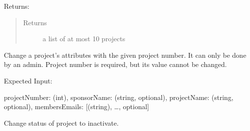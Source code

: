 \documentclass[letterpaper,10pt,english]{sphinxmanual}
\begin{document}
\begin{fulllineitems}
\begin{fulllineitems}
Returns:

\begin{sphinxVerbatim}
\end{sphinxVerbatim}
\begin{quote}\begin{description}
\item[{Returns}] \leavevmode
a list of at most 10 projects

\end{description}\end{quote}

\end{fulllineitems}


\begin{fulllineitems}
\label{\detokenize{apidoc/utdesign_procurement:utdesign_procurement.apigateway.ApiGateway.projectEdit}}
Change a project’s attributes with the given project number. It
can only be done by an admin. Project number is required, but
its value cannot be changed.

Expected Input:

\begin{sphinxVerbatim}[commandchars=\\\{\}]
\PYGZob{}
    projectNumber: (int),
    sponsorName: (string, optional),
    projectName: (string, optional),
    membersEmails: [(string), …, optional]
\PYGZcb{}
\end{sphinxVerbatim}

\end{fulllineitems}


\begin{fulllineitems}
\label{\detokenize{apidoc/utdesign_procurement:utdesign_procurement.apigateway.ApiGateway.projectInactivate}}
Change status of project to inactivate.


\end{fulllineitems}
\end{fulllineitems}
\end{document}
